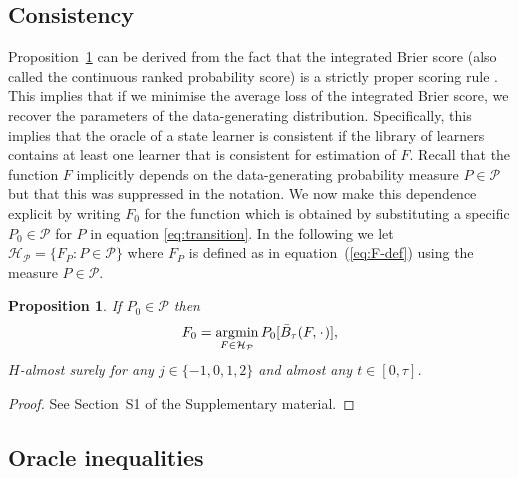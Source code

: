\documentclass[11pt]{article}
\theoremstyle{thmstyleone}%
\newtheorem{proposition}{Proposition}
\theoremstyle{thmstyletwo}%
\theoremstyle{thmstylethree}%
\DeclareMathOperator{\E}{\mathbb{E}} %
\newcommand{\blank}{\makebox[1ex]{\textbf{$\cdot$}}}
\renewcommand{\phi}{\varphi}
\newcommand{\1}{\mathds{1}}
\DeclareMathOperator*{\argmin}{\arg\!\min}
\begin{document}
\subsection{Consistency}
\label{sec:consistency}

Proposition~\ref{prop:stric-prop} can be derived from the fact that the
integrated Brier score (also called the continuous ranked probability score) is
a strictly proper scoring rule \citep{gneiting2007strictly}. This implies that
if we minimise the average loss of the integrated Brier score, we recover the
parameters of the data-generating distribution. Specifically, this implies that
the oracle of a state learner is consistent if the library of learners contains
at least one learner that is consistent for estimation of \( F \). Recall that
the function \(F\) implicitly depends on the data-generating probability measure
\(P\in\mathcal P\) but that this was suppressed in the notation. We now make
this dependence explicit by writing \(F_0\) for the function which is obtained
by substituting a specific \(P_0\in\mathcal{P}\) for \(P\) in equation
\eqref{eq:transition}. In the following we let
\( \mathcal{H}_{\mathcal{P}} = \{F_P : P \in \mathcal{P}\} \) where \( F_P \) is defined as in
equation~(\ref{eq:F-def}) using the measure \( P \in \mathcal{P} \).

\begin{proposition}
  \label{prop:stric-prop}
  If \(P_0\in\mathcal{P}\) then
  \begin{equation*}
    F_0 = \argmin_{F \in \mathcal{H}_{\mathcal{P}}} P_0{[\bar{B}_\tau(F, \blank)]},
  \end{equation*}
  \( H \)-almost surely for any \( j\in \{-1,0,1,2\} \) and almost any
  \( t \in [0, \tau]\).
\end{proposition}
\begin{proof}
  See Section~S1 of the Supplementary material.
\end{proof}

\subsection{Oracle inequalities}
\label{sec:finite-sample-oracle}
\end{document}
